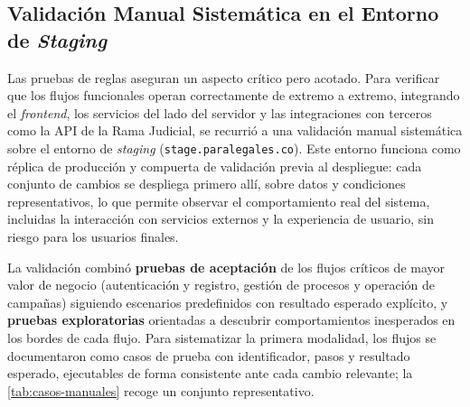 \subsection{Validación Manual Sistemática en el Entorno de \textit{Staging}}\label{subsec:validacion-manual}

Las pruebas de reglas aseguran un aspecto crítico pero acotado. Para verificar que los flujos funcionales operan correctamente de extremo a extremo, integrando el \textit{frontend}, los servicios del lado del servidor y las integraciones con terceros como la API de la Rama Judicial, se recurrió a una validación manual sistemática sobre el entorno de \textit{staging} (\texttt{stage.paralegales.co}). Este entorno funciona como réplica de producción y compuerta de validación previa al despliegue: cada conjunto de cambios se despliega primero allí, sobre datos y condiciones representativos, lo que permite observar el comportamiento real del sistema, incluidas la interacción con servicios externos y la experiencia de usuario, sin riesgo para los usuarios finales.

La validación combinó \textbf{pruebas de aceptación} de los flujos críticos de mayor valor de negocio (autenticación y registro, gestión de procesos y operación de campañas) siguiendo escenarios predefinidos con resultado esperado explícito, y \textbf{pruebas exploratorias} orientadas a descubrir comportamientos inesperados en los bordes de cada flujo. Para sistematizar la primera modalidad, los flujos se documentaron como casos de prueba con identificador, pasos y resultado esperado, ejecutables de forma consistente ante cada cambio relevante; la \autoref{tab:casos-manuales} recoge un conjunto representativo.

\newcommand\casosManualesCaption{Casos representativos de la validación manual sistemática ejecutada en \textit{staging}. \hspace{1em}}

